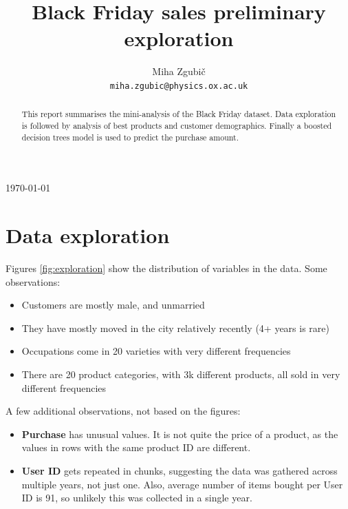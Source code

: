 \documentclass{article}
\title{Black Friday sales preliminary exploration}
\author{%
  Miha Zgubi\v{c}\\
  \texttt{miha.zgubic@physics.ox.ac.uk} \\
}
\begin{document}
\maketitle

\begin{abstract}
  This report summarises the mini-analysis of the Black Friday dataset. Data exploration is followed by analysis of best products and customer demographics. Finally a boosted decision trees model is used to predict the purchase amount.
\end{abstract}

\bigskip
\begin{center}
\today
\end{center}


\newpage
\linespread{1.0}
\noindent \hrulefill 
\tableofcontents
\smallskip
\noindent \hrulefill
\linespread{1.3}

\bigskip
\section{Data exploration}

Figures \ref{fig:exploration} show the distribution of variables in the data. Some observations:
\begin{itemize}
\item Customers are mostly male, and unmarried
\item They have mostly moved in the city relatively recently (4+ years is rare)
\item Occupations come in 20 varieties with very different frequencies
\item There are 20 product categories, with 3k different products, all sold in very different frequencies
\end{itemize}
A few additional observations, not based on the figures:
\begin{itemize}
\item \textbf{Purchase} has unusual values. It is not quite the price of a product, as the values in rows with the same product ID are different. 
\item \textbf{User ID} gets repeated in chunks, suggesting the data was gathered across multiple years, not just one. Also, average number of items bought per User ID is 91, so unlikely this was collected in a single year. 
\end{itemize}
\end{document}
